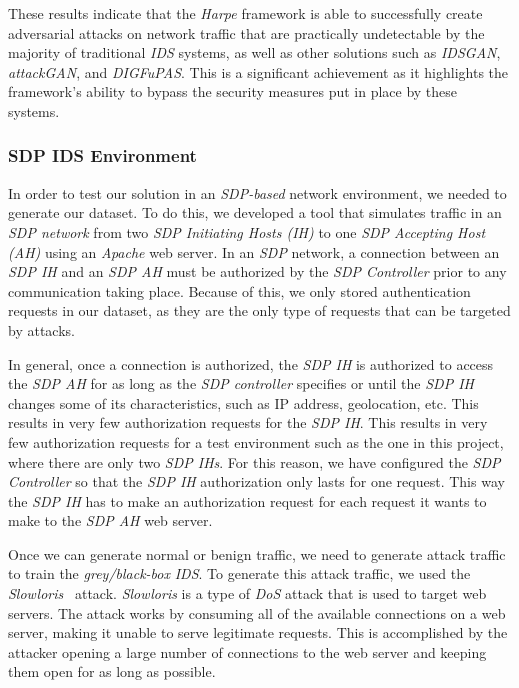 These results indicate that the \textit{Harpe} framework is able to successfully create adversarial attacks on network
traffic that are practically undetectable by the majority of traditional \textit{IDS} systems,
as well as other solutions such as \textit{IDSGAN}, \textit{attackGAN}, and \textit{DIGFuPAS}.
This is a significant achievement as it highlights the framework's ability to bypass the security measures put in place
by these systems.

\subsubsection{SDP IDS Environment}
In order to test our solution in an \textit{SDP-based} network environment, we needed to generate our dataset.
To do this, we developed a tool that simulates traffic in an \textit{SDP network} from two
\textit{SDP Initiating Hosts (IH)} to one \textit{SDP Accepting Host (AH)} using an \textit{Apache} web server.
In an \textit{SDP} network, a connection between an \textit{SDP IH} and an \textit{SDP AH} must be authorized by the
\textit{SDP Controller} prior to any communication taking place.
Because of this, we only stored authentication requests in our dataset, as they are the only type of requests that can
be targeted by attacks.

In general, once a connection is authorized, the \textit{SDP IH} is authorized to access the \textit{SDP AH} for as
long as the \textit{SDP controller} specifies or until the \textit{SDP IH} changes some of its characteristics, such as
IP address, geolocation, etc.
This results in very few authorization requests for the \textit{SDP IH}.
This results in very few authorization requests for a test environment such as the one in this project, where there are
only two \textit{SDP IHs}.
For this reason, we have configured the \textit{SDP Controller} so that the \textit{SDP IH} authorization only lasts
for one request.
This way the \textit{SDP IH} has to make an authorization request for each request it wants to make to the
\textit{SDP AH} web server.

Once we can generate normal or benign traffic, we need to generate attack traffic to train the \textit{grey/black-box}
\textit{IDS}.
To generate this attack traffic, we used the \textit{Slowloris}~\cite{damon2012hands} attack.
\textit{Slowloris} is a type of \textit{DoS} attack that is used to target web servers.
The attack works by consuming all of the available connections on a web server, making it unable to serve legitimate
requests.
This is accomplished by the attacker opening a large number of connections to the web server and keeping them open for
as long as possible.

